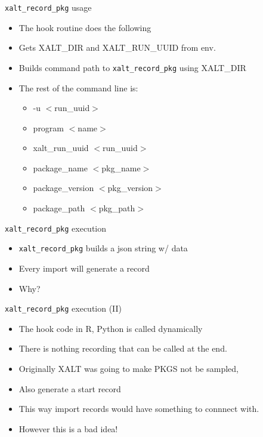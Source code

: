\documentclass{beamer}
\begin{document}
\begin{frame}{\texttt{xalt\_record\_pkg} usage}
  \begin{itemize}
    \item The hook routine does the following
    \item Gets XALT\_DIR and XALT\_RUN\_UUID from env.
    \item Builds command path to \texttt{xalt\_record\_pkg} using
      XALT\_DIR
    \item The rest of the command line is:
      \begin{itemize}
        \item -u $<$run\_uuid$>$
        \item program $<$name$>$
        \item xalt\_run\_uuid $<$run\_uuid$>$
        \item package\_name $<$pkg\_name$>$
        \item package\_version $<$pkg\_version$>$
        \item package\_path $<$pkg\_path$>$
      \end{itemize}
  \end{itemize}
\end{frame}

\begin{frame}{\texttt{xalt\_record\_pkg} execution}
  \begin{itemize}
    \item \texttt{xalt\_record\_pkg} builds a json string w/ data
    \item Every import will generate a record
    \item Why?
  \end{itemize}
\end{frame}

\begin{frame}{\texttt{xalt\_record\_pkg} execution (II)}
  \begin{itemize}
    \item The hook code in R, Python is called dynamically
    \item There is nothing recording that can be called at the end.
    \item Originally XALT was going to make PKGS not be sampled,
    \item Also generate a start record
    \item This way import records would have something to connnect
      with.
    \item However this is a bad idea!
  \end{itemize}
\end{frame}
\end{document}
